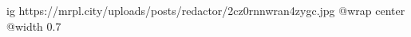  
 
 
 
 

\ifcmt
  ig https://mrpl.city/uploads/posts/redactor/2cz0rnnwran4zygc.jpg
  @wrap center
  @width 0.7
\fi
